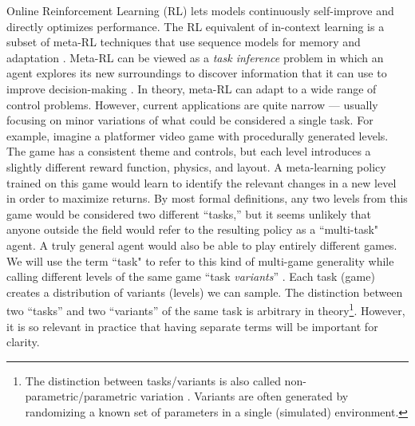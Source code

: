 Online Reinforcement Learning (RL) lets models continuously self-improve and directly optimizes performance. The RL equivalent of in-context learning is a subset of meta-RL techniques that use sequence models for memory and adaptation \cite{beck2023survey, wang2016learning, duan2016rl}. Meta-RL can be viewed as a \textit{task inference} problem in which an agent explores its new surroundings to discover information that it can use to improve decision-making \cite{humplik2019meta, ghosh2021generalization, zintgraf2022fast}. In theory, meta-RL can adapt to a wide range of control problems. However, current applications are quite narrow ---  usually focusing on minor variations of what could be considered a single task. For example, imagine a platformer video game with procedurally generated levels. The game has a consistent theme and controls, but each level introduces a slightly different reward function, physics, and layout. A meta-learning policy trained on this game would learn to identify the relevant changes in a new level in order to maximize returns. By most formal definitions, any two levels from this game would be considered two different ``tasks,'' but it seems unlikely that anyone outside the field would refer to the resulting policy as a ``multi-task" agent. A truly general agent would also be able to play entirely different games. We will use the term ``task" to refer to this kind of multi-game generality while calling different levels of the same game ``task \textit{variants}” \cite{zhao2022effectiveness, taiga2023investigating, rusu2022probing}. Each task (game) creates a distribution of variants (levels) we can sample. The distinction between two ``tasks'' and two ``variants'' of the same task is arbitrary in theory\footnote{The distinction between tasks/variants is also called non-parametric/parametric variation \cite{yu2020meta, lee2023parameterizing}. Variants are often generated by randomizing a known set of parameters in a single (simulated) environment.}. However, it is so relevant in practice that having separate terms will be important for clarity.

